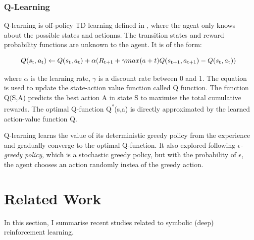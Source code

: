 \documentclass[12pt,twoside]{report}
\begin{document}

\subsection{Q-Learning}
\label{q_learning_section}

Q-learning is off-policy TD learning defined in \cite{Watkins}, where the agent only knows about the possible states and actionns. The transition states and reward probability functions are unknown to the agent.
It is of the form:

\begin{equation}
Q(s\textsubscript{t},a\textsubscript{t}) \leftarrow Q(s\textsubscript{t},a\textsubscript{t}) +  \alpha(R\textsubscript{t+1} + \gamma  max (a+t) Q(s\textsubscript{t+1}, a\textsubscript{t+1}) - Q(s\textsubscript{t}, a\textsubscript{t}))
\end{equation}

where $\alpha$ is the learning rate, $\gamma$ is a discount rate between 0 and 1. The equation is used to update the state-action value function called Q function. The function Q(S,A) predicts the best action A in state S to maximise the total cumulative rewards.
The optimal Q-function Q\textsuperscript{*}(s,a) is directly approximated by the learned action-value function Q.

Q-learning learns the value of its deterministic greedy policy from the experience and gradually converge to the optimal Q-function. It also explored following \textit{$\epsilon$-greedy policy}, which is a stochastic greedy policy, but with the probability of $\epsilon$, the agent chooses an action randomly instea of the greedy action.

\chapter{Related Work}
\label{related_work}
In this section, I summarise recent studies related to symbolic (deep) reinforcement learning.
\end{document}
